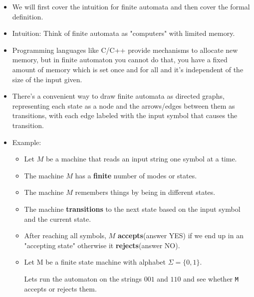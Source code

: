 \documentclass[11pt]{article}
\begin{document}
\begin{itemize}
    \item We will first cover the intuition for finite automata and then cover the formal definition.
    \item Intuition: Think of finite automata as "computers" with limited memory.
    \item Programming languages like C/C++ provide mechanisms to allocate new memory, but in finite automaton you cannot do that, you have a fixed amount of memory which is set once and for all and it's independent of the size of the input given.
    \item There's a convenient way to draw finite automata as directed graphs, representing each state as a node and the arrows/edges between them as transitions, with each edge labeled with the input symbol that causes the transition.
    \item Example:
    \begin{itemize}
    \item Let $M$ be a machine that reads an input string one symbol at a time.
    \item The machine $M$ has a \textbf{finite} number of modes or states.
    \item The machine $M$ remembers things by being in different states.
    \item The machine \textbf{transitions} to the next state based on the input symbol and the current state.
    \item After reaching all symbols, $M$ \textbf{accepts}(answer YES) if we end up in an "accepting state" otherwise it \textbf{rejects}(answer NO).
    \item[$ $] Let M be a finite state machine with alphabet $\Sigma=\{0,1\}$.
    \begin{center}
    \end{center}
    Lets run the automaton on the strings $001$ and $110$ and see whether \lstinline{M} accepts or rejects them.
    \begin{table}[H]
        \begin{center}


\end{center}
\end{table}
\end{itemize}
\end{itemize}
\end{document}
